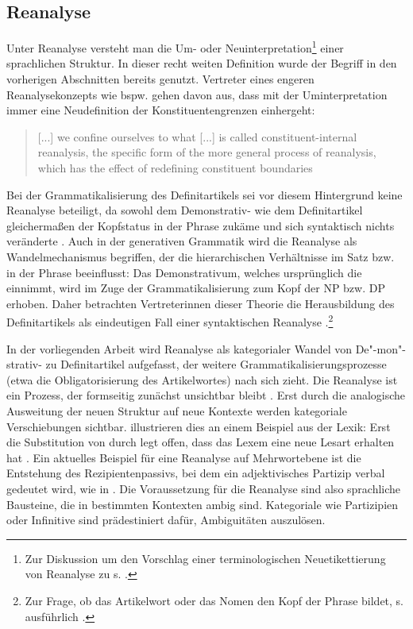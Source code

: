 \subsection{Reanalyse}\label{sec:reanalyse}

Unter Reanalyse versteht man die Um- oder Neuinterpretation\footnote{Zur Diskussion um den Vorschlag einer terminologischen Neuetikettierung von Reanalyse zu  s.  \textcite[36]{Traugott2013}.} einer sprachlichen Struktur. In dieser recht weiten Definition wurde der Begriff in den vorherigen Abschnitten bereits genutzt. Vertreter eines engeren Reanalysekonzepts wie bspw. \textcite[215]{Heine1991} gehen davon aus, dass mit der Uminterpretation immer eine Neudefinition der Konstituentengrenzen einhergeht: \blockcquote[216]{Heine1991}{[...] we confine ourselves to what [...] is called constituent-internal reanalysis, the specific form of the more general process of reanalysis, which has the effect of redefining constituent boundaries}. Bei der Grammatikalisierung des Definitartikels sei vor diesem Hintergrund keine Reanalyse  beteiligt, da sowohl dem Demonstrativ- wie dem Definitartikel gleichermaßen der Kopfstatus in der Phrase zukäme und sich syntaktisch nichts veränderte \parencite[219]{Heine1991}. Auch in der generativen Grammatik wird die Reanalyse als Wandelmechanismus begriffen, der die hierarchischen Verhältnisse im Satz bzw. in der Phrase beeinflusst: Das Demonstrativum, welches ursprünglich die  einnimmt, wird im Zuge der Grammatikalisierung zum Kopf der NP bzw. DP erhoben. Daher betrachten Vertreterinnen dieser Theorie die Herausbildung des Definitartikels als eindeutigen Fall einer syntaktischen Reanalyse \parencite[vgl. bspw.][]{Philippi1997,vanGelderen2007}.\footnote{Zur Frage, ob das Artikelwort oder das Nomen den Kopf der Phrase bildet, s. ausführlich \textcite[145--146]{Himmelmann1997}.}

In der vorliegenden Arbeit wird Reanalyse als kategorialer Wandel von De"-mon"-strativ- zu Definitartikel aufgefasst, der weitere Grammatikalisierungsprozesse (etwa die Obligatorisierung des Artikelwortes) nach sich zieht. Die Reanalyse ist ein Prozess, der formseitig zunächst unsichtbar bleibt \parencite[58]{Langacker1977}. Erst durch die analogische Ausweitung der neuen Struktur auf neue Kontexte werden kategoriale Verschiebungen sichtbar. \textcite[50]{Hopper2006} illustrieren dies an einem Beispiel aus der Lexik: Erst die Substitution von  durch  legt offen, dass das Lexem  eine neue Lesart erhalten hat \parencite[urspr. ][389]{Kluge2011}. Ein aktuelles Beispiel für eine Reanalyse auf Mehrwortebene ist die Entstehung des Rezipientenpassivs, bei dem ein adjektivisches Partizip verbal gedeutet wird, wie in  \parencite[152--153]{Szczepaniak2011a}.
Die Voraussetzung für die Reanalyse sind also sprachliche Bausteine, die in bestimmten Kontexten ambig sind. Kategoriale  wie Partizipien oder Infinitive \parencite[vgl. die Reanalyse des -Progressivs: Aus einem nominalen wird ein verbaler Infinitiv, s.][]{Flick2013} sind prädestiniert dafür, Ambiguitäten auszulösen. 

